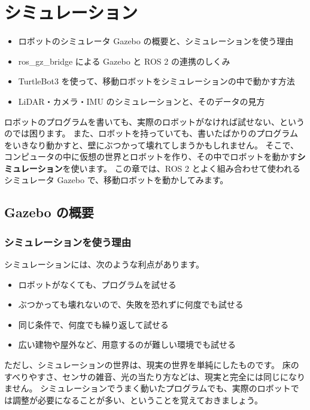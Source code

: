 \chapter{シミュレーション}
\label{chap:simulation}

\begin{goalbox}
  \begin{itemize}
    \item ロボットのシミュレータ Gazebo の概要と、シミュレーションを使う理由
    \item ros\_gz\_bridge による Gazebo と ROS 2 の連携のしくみ
    \item TurtleBot3 を使って、移動ロボットをシミュレーションの中で動かす方法
    \item LiDAR・カメラ・IMU のシミュレーションと、そのデータの見方
  \end{itemize}
\end{goalbox}

ロボットのプログラムを書いても、実際のロボットがなければ試せない、というのでは困ります。
また、ロボットを持っていても、書いたばかりのプログラムをいきなり動かすと、壁にぶつかって壊れてしまうかもしれません。
そこで、コンピュータの中に仮想の世界とロボットを作り、その中でロボットを動かす\textbf{シミュレーション}を使います。
この章では、ROS 2 とよく組み合わせて使われるシミュレータ Gazebo で、移動ロボットを動かしてみます。

\section{Gazebo の概要}
\label{sec:simulation-gazebo}

\subsection{シミュレーションを使う理由}

シミュレーションには、次のような利点があります。

\begin{itemize}
  \item ロボットがなくても、プログラムを試せる
  \item ぶつかっても壊れないので、失敗を恐れずに何度でも試せる
  \item 同じ条件で、何度でも繰り返して試せる
  \item 広い建物や屋外など、用意するのが難しい環境でも試せる
\end{itemize}

ただし、シミュレーションの世界は、現実の世界を単純にしたものです。
床のすべりやすさ、センサの雑音、光の当たり方などは、現実と完全には同じになりません。
シミュレーションでうまく動いたプログラムでも、実際のロボットでは調整が必要になることが多い、ということを覚えておきましょう。

